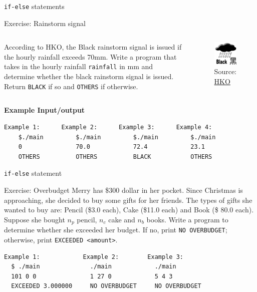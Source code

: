 \documentclass[10pt,xcolor={table,dvipsnames},t]{beamer}
\begin{document}
\begin{frame}[fragile]{\texttt{if-else} statements}
  \begin{exampleblock}{Exercise: Rainstorm signal}
    \begin{columns}
      According to HKO, the Black rainstorm signal is issued if the hourly rainfall exceeds 70mm. Write a program that takes in the hourly rainfall \texttt{rainfall} in mm and determine whether the black rainstorm signal is issued. Return \texttt{BLACK} if so and \texttt{OTHERS} if otherwise. 
      \begin{figure}
        \includegraphics{img/black-rain.png}
        \caption*{Source: \href{https://www.hko.gov.hk/en/wservice/warning/rainstor.htm}{HKO}}
      \end{figure}
    \end{columns}
  \end{exampleblock}
  \textbf{Example Input/output}
\begin{lstlisting}[language=bash]
    Example 1:      Example 2:      Example 3:      Example 4:
    $./main         $./main         $./main         $./main
    0               70.0            72.4            23.1
    OTHERS          OTHERS          BLACK           OTHERS
\end{lstlisting}
\end{frame}


\begin{frame}[fragile]{\texttt{if-else} statement}
  \begin{exampleblock}{Exercise: Overbudget}
    Merry has \$300 dollar in her pocket. Since Christmas is approaching, she decided to buy some gifts for her friends. The types of gifts she wanted to buy are: Pencil (\$3.0 each), Cake (\$11.0 each) and Book (\$ 80.0 each). Suppose she bought $n_p$ pencil, $n_c$ cake and $n_b$ books. Write a program to determine whether she exceeded her budget. If no, print \texttt{NO OVERBUDGET}; otherwise, print \texttt{EXCEEDED <amount>}.
  \end{exampleblock}
\begin{lstlisting}[language=bash]
  Example 1:            Example 2:        Example 3:
  $ ./main              ./main            ./main
  101 0 0               1 27 0            5 4 3
  EXCEEDED 3.000000     NO OVERBUDGET     NO OVERBUDGET    
\end{lstlisting}
\end{frame}
\end{document}
